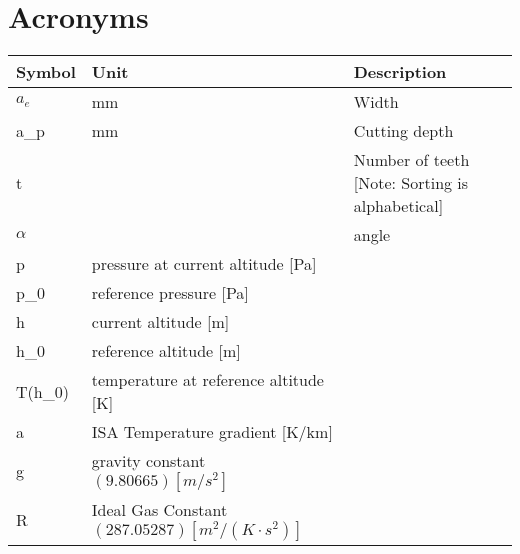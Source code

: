 \usepackage{import}%

\toc %

\chapter{Acronyms}
\newcommand{\rowheight}{3ex}
\begin{table}[ht!]
	\begin{tabularx}{\dimexpr\textwidth}{p{3cm} p{3cm} X}
		\textbf{Symbol} & \textbf{Unit} & \textbf{Description}   \\ \midrule
		$a_e$                  & mm               & Width \\[\rowheight]
		a\_p                   & mm               & Cutting depth \\[\rowheight]
		t            		   &                  & Number of teeth [Note: Sorting is alphabetical] \\[\rowheight]
		$\alpha$               &                  & angle \\[\rowheight]
		 p      & pressure at current altitude [Pa]                                \\[\rowheight]
    p_{0}  & reference pressure [Pa]                                          \\[\rowheight]
    h      & current altitude   [m]                                              \\[\rowheight]
    h_{0}  & reference altitude [m]                                           \\[\rowheight]
    T(h_0) & temperature at reference altitude [K]                             \\[\rowheight]
    a      & ISA Temperature gradient [K/km] \\[\rowheight]
    g      & gravity constant $(9.80665) [m/s^2]$                             \\[\rowheight]
    R      & Ideal Gas Constant  $(287.05287)[m^2/( K\cdot s^2)]$

	\end{tabularx}
\end{table}

